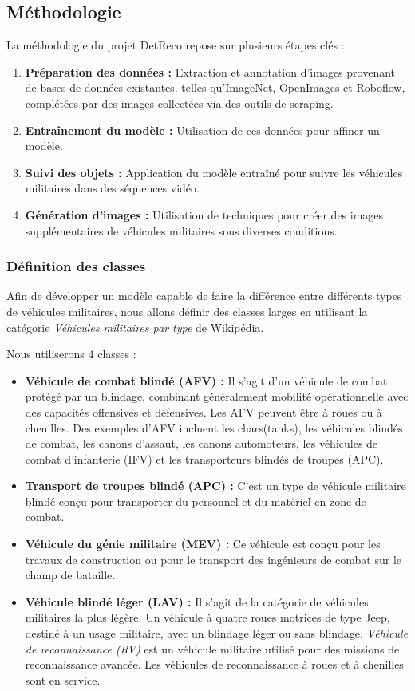 \subsection{Méthodologie}
La méthodologie du projet DetReco repose sur plusieurs étapes clés :
\begin{enumerate}
	\item \textbf{Préparation des données :} Extraction et annotation d'images provenant de bases de données existantes. telles qu'ImageNet, OpenImages et Roboflow, complétées par des images collectées via des outils de scraping.
	\item \textbf{Entraînement du modèle :} Utilisation de ces données pour affiner un modèle.
	\item \textbf{Suivi des objets :} Application du modèle entraîné pour suivre les véhicules militaires dans des séquences vidéo.
	\item \textbf{Génération d'images :} Utilisation de techniques pour créer des images supplémentaires de véhicules militaires sous diverses conditions.
\end{enumerate}

\subsubsection{Définition des classes}

Afin de développer un modèle capable de faire la différence entre différents types de véhicules militaires, nous allons définir des classes larges en utilisant la catégorie \textit{Véhicules militaires par type} de Wikipédia.

Nous utiliserons 4 classes :

\begin{itemize}
	\item \textbf{Véhicule de combat blindé (AFV) :} Il s'agit d'un véhicule de combat protégé par un blindage, combinant généralement mobilité opérationnelle avec des capacités offensives et défensives. Les AFV peuvent être à roues ou à chenilles. Des exemples d'AFV incluent les chars(tanks), les véhicules blindés de combat, les canons d'assaut, les canons automoteurs, les véhicules de combat d'infanterie (IFV) et les transporteurs blindés de troupes (APC).
	\item \textbf{Transport de troupes blindé (APC) :} C'est un type de véhicule militaire blindé conçu pour transporter du personnel et du matériel en zone de combat.
	\item \textbf{Véhicule du génie militaire (MEV) :} Ce véhicule est conçu pour les travaux de construction ou pour le transport des ingénieurs de combat sur le champ de bataille.
	\item \textbf{Véhicule blindé léger (LAV) :} Il s'agit de la catégorie de véhicules militaires la plus légère. Un véhicule à quatre roues motrices de type Jeep, destiné à un usage militaire, avec un blindage léger ou sans blindage. \textit{Véhicule de reconnaissance (RV)} est un véhicule militaire utilisé pour des missions de reconnaissance avancée. Les véhicules de reconnaissance à roues et à chenilles sont en service.
\end{itemize}

